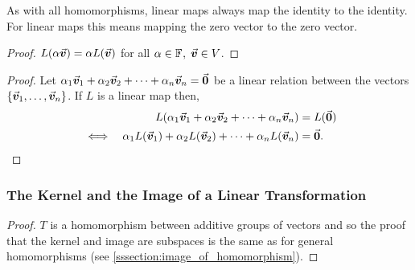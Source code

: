 \documentclass[MathsNotesBase.tex]{subfiles}
\begin{document}
{		\begin{corollary}
			As with all homomorphisms, linear maps always map the identity to the identity. For linear maps this means mapping the zero vector to the zero vector.
		\end{corollary}
		
		\bigskip
		\begin{tcolorbox}[breakable,enhanced jigsaw,colframe=white,colback=white,boxrule=0pt,arc=0pt,left=0pt,right=0pt,top=0pt,bottom=0pt]
			\begin{proof}
				${ L(\alpha \vec{\bm{v}}) = \alpha L(\vec{\bm{v}}) }$ for all ${ \alpha \in \mathbb{F}^{},\; \vec{\bm{v}} \in V }$.
			\end{proof}
		\end{tcolorbox}
		
		\medskip
		\begin{tcolorbox}[breakable,enhanced jigsaw,colframe=white,colback=white,boxrule=0pt,arc=0pt,left=0pt,right=0pt,top=0pt,bottom=0pt]
			\begin{proof}
				Let ${ \alpha_1 \vec{\bm{v}}_1 + \alpha_2 \vec{\bm{v}}_2 + \cdots + \alpha_n \vec{\bm{v}}_n = \vec{\bm{0}} }$ be a linear relation between the vectors ${ \{\vec{\bm{v}}_1,\dots,\vec{\bm{v}}_n\} }$. If $L$ is a linear map then,
				\begin{align*}
					&& L(\alpha_1 \vec{\bm{v}}_1 + \alpha_2 \vec{\bm{v}}_2 + \cdots + \alpha_n \vec{\bm{v}}_n) &= L(\vec{\bm{0}}) \\
					&\iff & \alpha_1 L(\vec{\bm{v}}_1) + \alpha_2 L(\vec{\bm{v}}_2) + \cdots + \alpha_n L(\vec{\bm{v}}_n) &= \vec{\bm{0}}. \qedhere \\
				\end{align*}
			\end{proof}
		\end{tcolorbox}
		
		
		\biggerskip
		\subsubsection{The Kernel and the Image of a Linear Transformation}
		
		\medskip
		\begin{proof}
			$T$ is a homomorphism between additive groups of vectors and so the proof that the kernel and image are subspaces is the same as for general homomorphisms (see \ref{sssection:image_of_homomorphism}).
		\end{proof}
	
}
\end{document}
